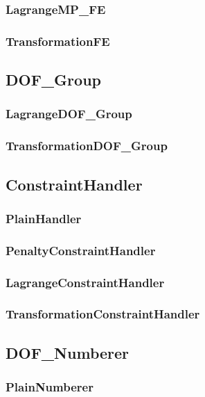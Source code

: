 \pagebreak \subsubsection{LagrangeMP\_FE}


\pagebreak \subsubsection{TransformationFE}


\pagebreak \subsection{DOF\_Group}


\pagebreak \subsubsection{LagrangeDOF\_Group}


\pagebreak \subsubsection{TransformationDOF\_Group}



\pagebreak \subsection{{\bf ConstraintHandler}}


\pagebreak \subsubsection{PlainHandler}


\pagebreak \subsubsection{PenaltyConstraintHandler}


\pagebreak \subsubsection{LagrangeConstraintHandler}


\pagebreak \subsubsection{TransformationConstraintHandler}


\pagebreak \subsection{DOF\_Numberer}


\pagebreak \subsubsection{PlainNumberer}


